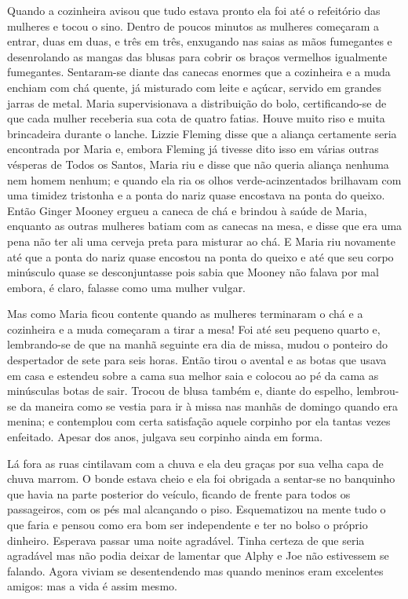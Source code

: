 Quando a cozinheira avisou que tudo estava pronto ela foi até o refeitório das
mulheres e tocou o sino.  Dentro de poucos minutos as mulheres começaram a
entrar, duas em duas, e três em três, enxugando nas saias as mãos fumegantes e
desenrolando as mangas das blusas para cobrir os braços vermelhos igualmente
fumegantes.  Sentaram-se diante das canecas enormes que a cozinheira e a muda
enchiam com chá quente, já misturado com leite e açúcar, servido em grandes
jarras de metal.  Maria supervisionava a distribuição do bolo, certificando-se
de que cada mulher receberia sua cota de quatro fatias.  Houve muito riso e
muita brincadeira durante o lanche.  Lizzie Fleming disse que a aliança
certamente seria encontrada por Maria e, embora Fleming já tivesse dito isso em
várias outras vésperas de Todos os Santos, Maria riu e disse que não queria
aliança nenhuma nem homem nenhum; e quando ela ria os olhos verde-acinzentados
brilhavam com uma timidez tristonha e a ponta do nariz quase encostava na ponta
do queixo.  Então Ginger Mooney ergueu a caneca de chá e brindou à saúde de
Maria, enquanto as outras mulheres batiam com as canecas na mesa, e disse que
era uma pena não ter ali uma cerveja preta para misturar ao chá.  E Maria riu
novamente até que a ponta do nariz quase encostou na ponta do queixo e até que
seu corpo minúsculo quase se desconjuntasse pois sabia que Mooney não falava
por mal embora, é claro, falasse como uma mulher vulgar.

Mas como Maria ficou contente quando as mulheres terminaram o chá e a
cozinheira e a muda começaram a tirar a mesa!  Foi até seu pequeno quarto e,
lembrando-se de que na manhã seguinte era dia de missa, mudou o ponteiro do
despertador de sete para seis horas.  Então tirou o avental e as botas que
usava em casa e estendeu sobre a cama sua melhor saia e colocou ao pé da cama
as minúsculas botas de sair.  Trocou de blusa também e, diante do espelho,
lembrou-se da maneira como se vestia para ir à missa nas manhãs de domingo
quando era menina; e contemplou com certa satisfação aquele corpinho por ela
tantas vezes enfeitado.  Apesar dos anos, julgava seu corpinho ainda em forma.

Lá fora as ruas cintilavam com a chuva e ela deu graças por sua velha capa de
chuva marrom.  O bonde estava cheio e ela foi obrigada a sentar-se no banquinho
que havia na parte posterior do veículo, ficando de frente para todos os
passageiros, com os pés mal alcançando o piso.  Esquematizou na mente tudo o
que faria e pensou como era bom ser independente e ter no bolso o próprio
dinheiro.  Esperava passar uma noite agradável.  Tinha certeza de que seria
agradável mas não podia deixar de lamentar que Alphy e Joe não estivessem se
falando.  Agora viviam se desentendendo mas quando meninos eram excelentes
amigos: mas a vida é assim mesmo.

